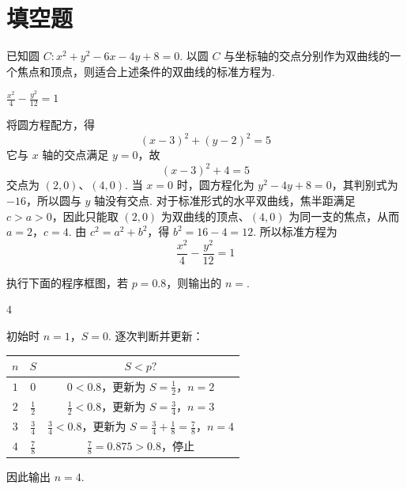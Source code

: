 \section{填空题}

\begin{problem}
已知圆 \(C: x^{2} + y^{2} - 6x - 4y + 8 = 0\). 以圆 \(C\) 与坐标轴的交点分别作为双曲线的一个焦点和顶点，则适合上述条件的双曲线的标准方程为\fillinblank{}.
\end{problem}

\begin{answer}
\(\frac{x^{2}}{4} - \frac{y^{2}}{12} = 1\)
\end{answer}

\begin{solution}
将圆方程配方，得
\[
(x-3)^2+(y-2)^2=5
\]
它与 \(x\) 轴的交点满足 \(y=0\)，故
\[
(x-3)^2+4=5
\]交点为 \((2,0)\)、\((4,0)\). 当 \(x=0\) 时，圆方程化为 \(y^2-4y+8=0\)，其判别式为 \(-16\)，所以圆与 \(y\) 轴没有交点. 对于标准形式的水平双曲线，焦半距满足 \(c>a>0\)，因此只能取 \((2,0)\) 为双曲线的顶点、\((4,0)\) 为同一支的焦点，从而 \(a=2\)，\(c=4\). 由 \(c^2=a^2+b^2\)，得 \(b^2=16-4=12\). 所以标准方程为
\[
\frac{x^2}{4}-\frac{y^2}{12}=1
\]
\end{solution}

\begin{problem}
执行下面的程序框图，若 \(p = 0.8\)，则输出的 \(n =\)\fillinblank{}.

\end{problem}

\begin{answer}
\(4\)
\end{answer}

\begin{solution}
初始时 \(n=1\)，\(S=0\). 逐次判断并更新：
\begin{center}
\begin{tabular}{c|c|c}
\(n\) & \(S\) & \(S<p?\) \\ \hline
\(1\) & \(0\) & \(0<0.8\)，更新为 \(S=\frac12\)，\(n=2\) \\
\(2\) & \(\frac12\) & \(\frac12<0.8\)，更新为 \(S=\frac34\)，\(n=3\) \\
\(3\) & \(\frac34\) & \(\frac34<0.8\)，更新为 \(S=\frac34+\frac18=\frac78\)，\(n=4\) \\
\(4\) & \(\frac78\) & \(\frac78=0.875>0.8\)，停止
\end{tabular}
\end{center}
因此输出 \(n=4\).
\end{solution}


